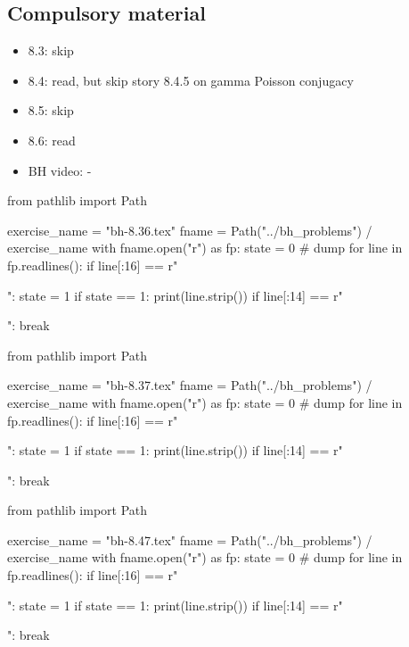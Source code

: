 \subsection{Compulsory material}
\label{sec:compulsory-material}


\begin{itemize}
\item 8.3: skip
\item 8.4: read, but skip story 8.4.5 on gamma Poisson conjugacy
\item 8.5: skip
\item 8.6: read
\item BH video: -
\end{itemize}

\begin{pycode}
from pathlib import Path

exercise_name = "bh-8.36.tex"
fname = Path("../bh_problems") / exercise_name
with fname.open("r") as fp:
    state = 0  # dump
    for line in fp.readlines():
        if line[:16] == r"\begin{exercise}":
            state = 1
        if state == 1:
            print(line.strip())
        if line[:14] == r"\end{exercise}":
            break
\end{pycode}


\begin{pycode}
from pathlib import Path

exercise_name = "bh-8.37.tex"
fname = Path("../bh_problems") / exercise_name
with fname.open("r") as fp:
    state = 0  # dump
    for line in fp.readlines():
        if line[:16] == r"\begin{exercise}":
            state = 1
        if state == 1:
            print(line.strip())
        if line[:14] == r"\end{exercise}":
            break
\end{pycode}

\begin{pycode}
from pathlib import Path

exercise_name = "bh-8.47.tex"
fname = Path("../bh_problems") / exercise_name
with fname.open("r") as fp:
    state = 0  # dump
    for line in fp.readlines():
        if line[:16] == r"\begin{exercise}":
            state = 1
        if state == 1:
            print(line.strip())
        if line[:14] == r"\end{exercise}":
            break
\end{pycode}

